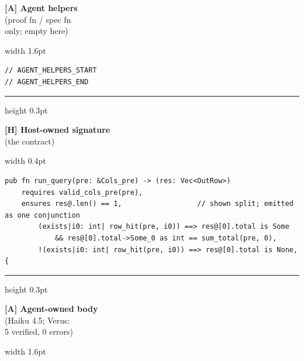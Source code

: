 \noindent\begin{minipage}[c]{0.2\textwidth}\raggedleft\footnotesize
\textbf{[A] Agent helpers} \\ {\scriptsize (proof fn / spec fn \\ only; empty here)}\end{minipage}\hspace{4pt}\vrule width 1.6pt\hspace{4pt}%
\begin{minipage}[c]{0.74\textwidth}
\begin{lstlisting}[style=lemmacode]
// AGENT_HELPERS_START
// AGENT_HELPERS_END
\end{lstlisting}\end{minipage}\par\vspace{2pt}\hrule height 0.3pt\vspace{2pt}
\noindent\begin{minipage}[c]{0.2\textwidth}\raggedleft\footnotesize
\textbf{[H] Host-owned signature} \\ {\scriptsize (the contract)}\end{minipage}\hspace{4pt}\vrule width 0.4pt\hspace{4pt}%
\begin{minipage}[c]{0.74\textwidth}
\begin{lstlisting}[style=lemmacode]
pub fn run_query(pre: &Cols_pre) -> (res: Vec<OutRow>)
    requires valid_cols_pre(pre),
    ensures res@.len() == 1,                  // shown split; emitted as one conjunction
        (exists|i0: int| row_hit(pre, i0)) ==> res@[0].total is Some
            && res@[0].total->Some_0 as int == sum_total(pre, 0),
        !(exists|i0: int| row_hit(pre, i0)) ==> res@[0].total is None,
{
\end{lstlisting}\end{minipage}\par\vspace{2pt}\hrule height 0.3pt\vspace{2pt}
\noindent\begin{minipage}[c]{0.2\textwidth}\raggedleft\footnotesize
\textbf{[A] Agent-owned body} \\ {\scriptsize (Haiku 4.5; Verus: \\ 5 verified, 0 errors)}\end{minipage}\hspace{4pt}\vrule width 1.6pt\hspace{4pt}%

